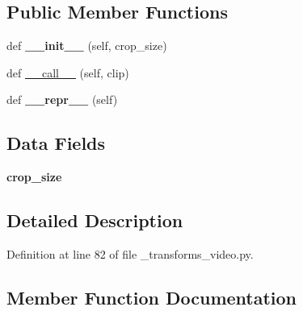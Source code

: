\subsection*{Public Member Functions}
\begin{DoxyCompactItemize}
\item 
\mbox{\label{classtorchvision_1_1transforms_1_1__transforms__video_1_1CenterCropVideo_a3edf72e76056e6ff7211e52023133850}} 
def {\bfseries \+\_\+\+\_\+init\+\_\+\+\_\+} (self, crop\+\_\+size)
\item 
def \hyperlink{classtorchvision_1_1transforms_1_1__transforms__video_1_1CenterCropVideo_ab3e6f4d9db158cc8a878babaca2fd23e}{\+\_\+\+\_\+call\+\_\+\+\_\+} (self, clip)
\item 
\mbox{\label{classtorchvision_1_1transforms_1_1__transforms__video_1_1CenterCropVideo_a694b57deb9e3caaa3b5762f2b3e3d80b}} 
def {\bfseries \+\_\+\+\_\+repr\+\_\+\+\_\+} (self)
\end{DoxyCompactItemize}
\subsection*{Data Fields}
\begin{DoxyCompactItemize}
\item 
\mbox{\label{classtorchvision_1_1transforms_1_1__transforms__video_1_1CenterCropVideo_a09dd63609137393ec6be85e56a19584c}} 
{\bfseries crop\+\_\+size}
\end{DoxyCompactItemize}


\subsection{Detailed Description}


Definition at line 82 of file \+\_\+transforms\+\_\+video.\+py.



\subsection{Member Function Documentation}
\mbox{\label{classtorchvision_1_1transforms_1_1__transforms__video_1_1CenterCropVideo_ab3e6f4d9db158cc8a878babaca2fd23e}} 
